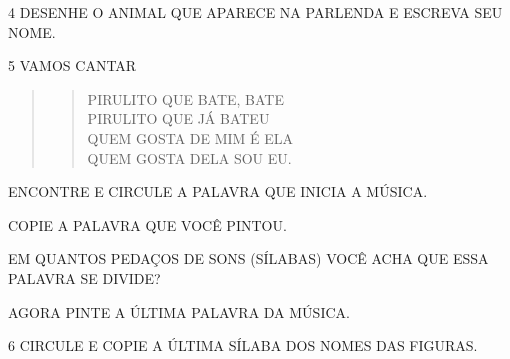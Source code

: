 \num{4} DESENHE O ANIMAL QUE APARECE NA PARLENDA E ESCREVA SEU NOME.

\begin{mdframed}[linewidth=2pt,linecolor=salmao,roundcorner=2pt]
\vspace{12cm}
\end{mdframed}

\pagebreak
\num{5} VAMOS CANTAR


\begin{quote}
\begin{verse}
PIRULITO QUE BATE, BATE\\
PIRULITO QUE JÁ BATEU\\
QUEM GOSTA DE MIM É ELA\\
QUEM GOSTA DELA SOU EU.
\end{verse}
\end{quote}

\begin{escolha}
\item ENCONTRE E CIRCULE A PALAVRA QUE INICIA A MÚSICA.

\item COPIE A PALAVRA QUE VOCÊ PINTOU.

\item EM QUANTOS PEDAÇOS DE SONS (SÍLABAS) VOCÊ ACHA QUE ESSA PALAVRA SE DIVIDE?


\item AGORA PINTE A ÚLTIMA PALAVRA DA MÚSICA.
\end{escolha}

\num{6} CIRCULE E COPIE A ÚLTIMA SÍLABA DOS NOMES DAS FIGURAS.

